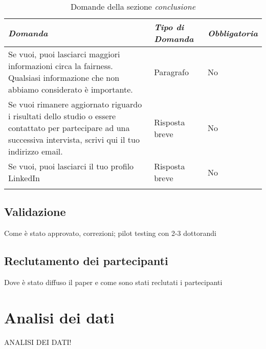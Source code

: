 \begin{longtable}{| p{} | p{} | p{} |} 
\hline\textbf{\textit{Domanda}} & \textbf{\textit{Tipo di Domanda}} & \textbf{\textit{Obbligatoria}}\\
\hline
\endhead 

\hline 
Se vuoi, puoi lasciarci maggiori informazioni circa la fairness. Qualsiasi informazione che non abbiamo considerato è importante.

& Paragrafo

& No

\\ \hline
\rowcolor{Gray!30}
Se vuoi rimanere aggiornato riguardo i risultati dello studio o essere contattato per partecipare ad una successiva intervista, scrivi qui il tuo indirizzo email.

& Risposta breve

& No

\\ \hline
Se vuoi, puoi lasciarci il tuo profilo LinkedIn

& Risposta breve

& No

\\ \hline
\caption{Domande della sezione \emph{conclusione}} %
\label{tab:myfirstlongtable}
\end{longtable}

\subsection{Validazione}
Come è stato approvato, correzioni; pilot testing con 2-3 dottorandi
\subsection{Reclutamento dei partecipanti}
Dove è stato diffuso il paper e come sono stati reclutati i partecipanti
\section{Analisi dei dati}
ANALISI DEI DATI!
\newpage
